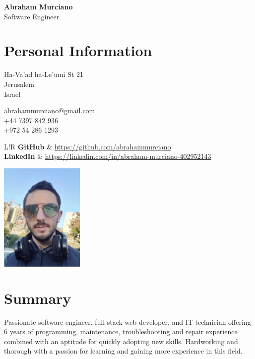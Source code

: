 \documentclass{article}
\newcommand\VRule{\color{lightgray}\vrule width 0.4pt}
\begin{document}
\hspace{-19.4pt}
\begin{minipage}{0.8\textwidth}
	{\bfseries\Huge Abraham Murciano}\vspace{4pt}\\
	{\large Software Engineer}

	\section*{Personal Information}
	\begin{multicols}{2}
		Ha-Va'ad ha-Le'umi St 21\\
		Jerusalem\\
		Israel
		\columnbreak

		abrahammurciano@gmail.com\\
		+44 7397 842 936\\
		+972 54 286 1293
		\columnbreak
	\end{multicols}
	\begin{tabular}{L!{\VRule}R}
		\textbf{GitHub}   & \url{https://github.com/abrahammurciano} \\
		\textbf{LinkedIn} & \url{https://linkedin.com/in/abraham-murciano-402952143}
	\end{tabular}
\end{minipage}
%
\hspace{-20pt}
\begin{minipage}{115pt}
	\begin{flushright}
		\includegraphics[width=115pt]{profile-portrait.jpg}
	\end{flushright}
\end{minipage}

\section*{Summary}
Passionate software engineer, full stack web developer, and IT technician offering 6 years of programming, maintenance, troubleshooting and repair experience combined with an aptitude for quickly adopting new skills. Hardworking and thorough with a passion for learning and gaining more experience in this field.
\end{document}
